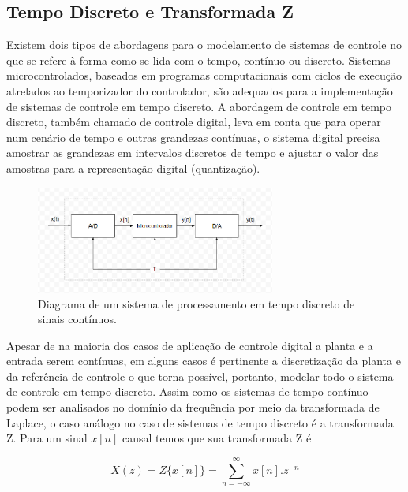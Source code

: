 \subsection{Tempo Discreto e Transformada Z}

Existem dois tipos de abordagens para o modelamento de sistemas de controle no que se refere à forma como se lida com o tempo, contínuo ou discreto. Sistemas microcontrolados, baseados em programas computacionais com ciclos de execução atrelados ao temporizador do controlador, são adequados para a implementação de sistemas de controle em tempo discreto. A abordagem de controle em tempo discreto, também chamado de controle digital, leva em conta que para operar num cenário de tempo e outras grandezas contínuas, o sistema digital precisa amostrar as grandezas em intervalos discretos de tempo e ajustar o valor das amostras para a representação digital (quantização). 

\begin{figure}[ht]
    \begin{center}
    \includegraphics[width=0.7\textwidth]{figuras/discreto.PNG}
    \end{center}
    \caption[Diagrama de um sistema de processamento em tempo discreto.]{Diagrama de um sistema de processamento em tempo discreto de sinais contínuos.}
    \label{disc}
\end{figure}

Apesar de na maioria dos casos de aplicação de controle digital a planta e a entrada serem contínuas, em alguns casos é pertinente a discretização da planta e da referência de controle o que torna possível, portanto, modelar todo o sistema de controle em tempo discreto. Assim como os sistemas de tempo contínuo podem ser analisados no domínio da frequência por meio da transformada de Laplace, o caso análogo no caso de sistemas de tempo discreto é a transformada Z. Para um sinal $x[n]$ causal temos que sua transformada Z é

\begin{equation}
    \label{eq:cd_1}
    X(z) = Z\{x[n]\} = \sum_{n=-\infty}^{\infty} x[n].z^{-n} 
\end{equation}

